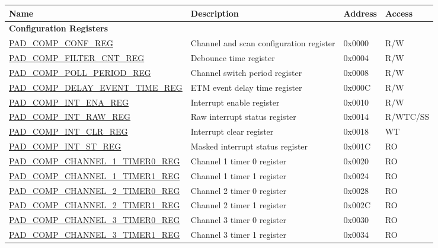 \begin{longtable}{ | p{6cm} | p{6.8cm} | p{1.3cm} | p{1.4cm} | }
\hline\rowcolor{lightgray}
Name & Description & Address & Access \\ \hline
\endhead
\multicolumn{4}{|l|}{\textbf{Configuration Registers}} \\ \hline
\hyperref[regdesc:PADCOMPCONFREG]{PAD\_COMP\_CONF\_REG} & Channel and scan configuration register & 0x0000 & R/W \\ \hline
\hyperref[regdesc:PADCOMPFILTERCNTREG]{PAD\_COMP\_FILTER\_CNT\_REG} & Debounce time register & 0x0004 & R/W \\ \hline
\hyperref[regdesc:PADCOMPPOLLPERIODREG]{PAD\_COMP\_POLL\_PERIOD\_REG} & Channel switch period register & 0x0008 & R/W \\ \hline
\hyperref[regdesc:PADCOMPDELAYEVENTTIMEREG]{PAD\_COMP\_DELAY\_EVENT\_TIME\_REG} & ETM event delay time register & 0x000C & R/W \\ \hline
\hyperref[regdesc:PADCOMPINTENAREG]{PAD\_COMP\_INT\_ENA\_REG} & Interrupt enable register & 0x0010 & R/W \\ \hline
\hyperref[regdesc:PADCOMPINTRAWREG]{PAD\_COMP\_INT\_RAW\_REG} & Raw interrupt status register & 0x0014 & R/WTC/SS \\ \hline
\hyperref[regdesc:PADCOMPINTCLRREG]{PAD\_COMP\_INT\_CLR\_REG} & Interrupt clear register & 0x0018 & WT \\ \hline
\hyperref[regdesc:PADCOMPINTSTREG]{PAD\_COMP\_INT\_ST\_REG} & Masked interrupt status register & 0x001C & RO \\ \hline
\hyperref[regdesc:PADCOMPCHANNEL1TIMER0REG]{PAD\_COMP\_CHANNEL\_1\_TIMER0\_REG} & Channel 1 timer 0 register & 0x0020 & RO \\ \hline
\hyperref[regdesc:PADCOMPCHANNEL1TIMER1REG]{PAD\_COMP\_CHANNEL\_1\_TIMER1\_REG} & Channel 1 timer 1 register & 0x0024 & RO \\ \hline
\hyperref[regdesc:PADCOMPCHANNEL2TIMER0REG]{PAD\_COMP\_CHANNEL\_2\_TIMER0\_REG} & Channel 2 timer 0 register & 0x0028 & RO \\ \hline
\hyperref[regdesc:PADCOMPCHANNEL2TIMER1REG]{PAD\_COMP\_CHANNEL\_2\_TIMER1\_REG} & Channel 2 timer 1 register & 0x002C & RO \\ \hline
\hyperref[regdesc:PADCOMPCHANNEL3TIMER0REG]{PAD\_COMP\_CHANNEL\_3\_TIMER0\_REG} & Channel 3 timer 0 register & 0x0030 & RO \\ \hline
\hyperref[regdesc:PADCOMPCHANNEL3TIMER1REG]{PAD\_COMP\_CHANNEL\_3\_TIMER1\_REG} & Channel 3 timer 1 register & 0x0034 & RO \\ \hline

\end{longtable}
